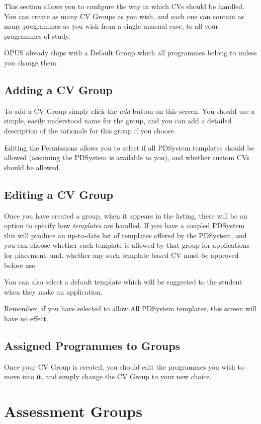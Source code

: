 \documentclass[12 pt]{book}
\begin{document}
This section allows you to configure the way in which CVs should be handled.
You can create as many CV Groups as you wish, and each one can contain as many
programmes as you wish from a single unusual case, to all your programmes of
study.

OPUS already ships with a Default Group which all programmes belong to unless
you change them.

\subsection{Adding a CV Group}

To add a CV Group simply click the \emph{add} button on this screen. You should
use a simple, easily understood name for the group, and you can add a detailed
description of the rationale for this group if you choose.

Editing the Permissions allows you to select if all PDSystem templates should 
be allowed (assuming the PDSystem is available to you), and whether custom CVs
should be allowed.

\subsection{Editing a CV Group}

Once you have created a group, when it appears in the listing, there will be
an option to specify how \emph{templates} are handled. If you have a coupled
PDSystem this will produce an up-to-date list of templates offered by the
PDSystem, and you can choose whether each template is allowed by that group
for applications for placement, and, whether any such template based CV must 
be approved before use.

You can also select a default template which will be suggested to the student
when they make an application.

Remember, if you have selected to allow All PDSystem templates, this screen
will have no effect.

\subsection{Assigned Programmes to Groups}

Once your CV Group is created, you should edit the programmes you wish to move
into it, and simply change the CV Group to your new choice.

\section{Assessment Groups}
\end{document}

